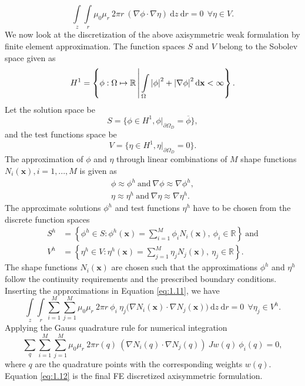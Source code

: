 \begin{equation}
\int\limits_{z} \int\limits_{r} \mu_0 \mu_r \ 2 \pi r \ (\nabla \phi \cdot \nabla \eta) \ \mathrm{d}z \ \mathrm{d}r = 0 \ \ \forall \eta \in V.
\label{eq:1.11}
\end{equation}
We now look at the discretization of the above axisymmetric weak formulation by finite element approximation. The function spaces $S$ and $V$ belong to the Sobolev space given as
\begin{equation}
H^1 = \left\lbrace \phi : \Omega \mapsto \mathbb{R} \,\middle\vert\, \int\limits_{\Omega} \left\lvert \phi \right\rvert^2 + \left\lvert \nabla \phi \right\rvert^2 \mathrm{d}\mathbf{x} < \infty \right\rbrace.
\end{equation}
Let the solution space be
\begin{equation}
S = \{ \phi \in H^1, \phi|_{\partial \Omega_{D}} = \overline{\phi} \},
\end{equation}
and the test functions space be
\begin{equation}
V = \{ \eta \in H^1, \eta|_{\partial \Omega_{D}} = 0\}.
\end{equation}
The approximation of $\phi$ and $\eta$ through linear combinations of $M$ shape functions $N_i (\mathbf{x}), i =1,...,M$ is given as
\begin{align}
\phi \approx \phi^h \ \text{and} \ \nabla \phi \approx \nabla \phi^h, \nonumber\\
\eta \approx \eta^h \ \text{and} \ \nabla \eta \approx \nabla \eta^h.
\end{align}
The approximate solutions $\phi^h$ and test functions $\eta^h$ have to be chosen from the discrete function spaces 
\begin{align}
S^h &= \left\{\phi^h \in S : \phi^h(\textbf{x}) = \sum_{i=1}^{\textit{M}} \phi_i N_i (\textbf{x}), \ \phi_i \in \mathbb{R} \right\} \ \text{and} \nonumber\\
V^h &= \left\{\eta^h \in V : \eta^h(\textbf{x}) = \sum_{j=1}^{\textit{M}} \eta_j N_j (\textbf{x}), \ \eta_j \in \mathbb{R} \right\}.
\end{align}
The shape functions $N_i (\mathbf{x})$ are chosen such that the approximations $\phi^h$ and $\eta^h$ follow the continuity requirements and the prescribed boundary conditions. Inserting the approximations in Equation \eqref{eq:1.11}, we have
\begin{equation}
\int\limits_{z} \int\limits_{r} \sum\limits_{i=1}^{M} \sum\limits_{j=1}^{M} \mu_0 \mu_r \ 2 \pi r \ \phi_i \ \eta_j \Big( \nabla N_i (\mathbf{x}) \cdot \nabla N_j (\mathbf{x}) \Big) \ \mathrm{d}z \ \mathrm{d}r = 0 \ \ \forall \eta_j \in V^h.
\end{equation}
Applying the Gauss quadrature rule for numerical integration
\begin{equation}
\sum\limits_{q} \sum\limits_{i=1}^{M} \sum\limits_{j=1}^{M} \mu_0 \mu_r \ 2 \pi r(q) \ (\nabla N_i (q) \cdot \nabla N_j (q)) \ J w(q) \ \phi_i(q)= 0,
\label{eq:1.12}
\end{equation}
where $q$ are the quadrature points with the corresponding weights $w(q)$. Equation \eqref{eq:1.12} is the final FE discretized axisymmetric formulation.

